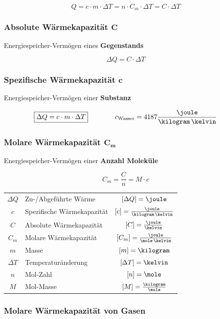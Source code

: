 $$ \boxed{ Q = c \cdot m \cdot \Delta T = n \cdot C_m \cdot \Delta T = C \cdot \Delta T } $$


\subsubsection{Absolute Wärmekapazität $\bm{C}$}

Energiespeicher-Vermögen eines \textbf{Gegenstands}

$$ \boxed{ \Delta Q = C \cdot \Delta T } $$


\subsubsection{Spezifische Wärmekapazität $\bm{c}$}

Energiespeicher-Vermögen einer \textbf{Substanz}

$$ \boxed{ \Delta Q = c \cdot m \cdot \Delta T } \qquad \qquad c_{\rm Wasser} = 4187 \frac{\joule}{\kilogram \, \kelvin} $$


\subsubsection{Molare Wärmekapazität $\bm {C_m}$}

Energiespeicher-Vermögen einer \textbf{Anzahl Moleküle}

$$ \boxed{ C_m = \frac{C}{n} = M \cdot c } $$

\renewcommand{\arraystretch}{1.3}
\begin{tabular}{c l c}
	$\Delta Q$	& Zu-/Abgeführte Wärme 			& $[\Delta Q] = \joule$ 						\\
	$c$ 		& Spezifische Wärmekapazität 	& $[c] = \frac{\joule}{\kilogram \, \kelvin}$ 	\\
	$C$ 		& Absolute Wärmekapazität 		& $[C] = \frac{\joule}{\kelvin}$ 				\\
	$C_m$ 		& Molare Wärmekapazität 		& $[C_m] = \frac{\joule}{\mole \, \kelvin}$ 	\\
	$m$ 		& Masse 						& $[m] = \kilogram$ 							\\
	$\Delta T$ 	& Temperaturänderung 			& $[\Delta T] = \kelvin$ 						\\
	$n$ 		& Mol-Zahl 						& $[n] = \mole$ 								\\
	$M$ 		& Mol-Masse 					& $[M] = \frac{\kilogram}{\mole}$
\end{tabular}
\renewcommand{\arraystretch}{1}


\subsubsection{Molare Wärmekapazität von Gasen}

